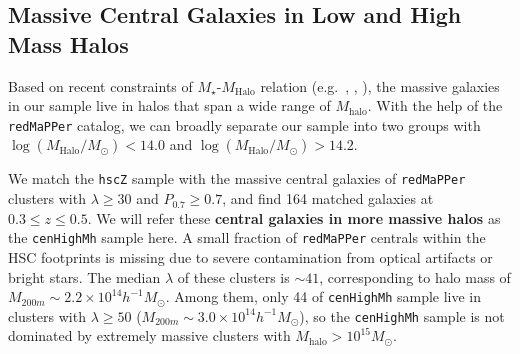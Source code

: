 \documentclass{emulateapj}
\def\arcsec{{\prime\prime}}
\def\redm{\texttt{redMaPPer}}
\def\rbcg{\texttt{cenHighMh}}
\def\mhalo{{$M_{\mathrm{halo}}$}}
\def\logmh{{$\log (M_{\mathrm{Halo}}/M_{\odot})$}}
\begin{document}
\begin{CJK*}{UTF8}{gbsn}
 
\subsection{Massive Central Galaxies in Low and High Mass Halos}
    \label{ssec:mass_central}
        
    Based on recent constraints of $M_{\star}$-$M_{\mathrm{Halo}}$ relation 
    (e.g.\ \citealt{Leauthaud2012}, \citealt{Behroozi2013}, \citealt{Kravtsov2014}),
    the massive galaxies in our sample live in halos that span a wide range of 
    \mhalo{}.
    With the help of the \redm{} catalog, we can broadly separate our sample into two
    groups with \logmh{}$<14.0$ and \logmh{}$>14.2$.
    
    
    We match the \texttt{hscZ} sample with the massive central galaxies of 
    \redm{} clusters with $\lambda \geq 30$ and $P_{\mathrm{0.7}} \geq 0.7$,
    and find 164 matched galaxies at $0.3 \leq z \leq 0.5$.
    We will refer these \textbf{central galaxies in more massive halos} as the 
    \rbcg{} sample here.
    A small fraction of \redm{} centrals within the HSC footprints is missing  
    due to severe contamination from optical artifacts or bright stars.
    The median $\lambda$ of these clusters is $\sim 41$, corresponding to 
    halo mass of $M_{200m}\sim 2.2\times 10^{14} h^{-1} M_{\odot}$.
    Among them, only 44 of \rbcg{} sample live in clusters with $\lambda \geq 50$
    ($M_{200m} \sim 3.0\times 10^{14} h^{-1} M_{\odot}$), so the \rbcg{} sample is 
    not dominated by extremely massive clusters with \mhalo{}$>10^{15} M_{\odot}$. 
    

\end{CJK*}
\end{document}
